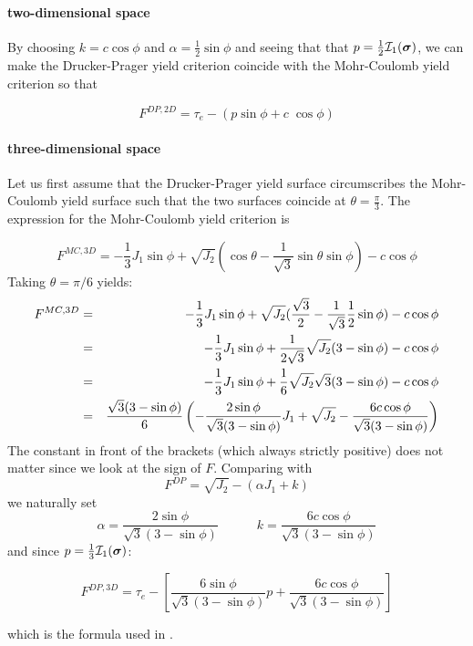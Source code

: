 \paragraph{two-dimensional space}

By choosing $k=c \cos \phi $ and $\alpha=\frac{1}{2}\sin \phi$ and seeing that that $p=\frac{1}{2} {\cal I}_1({\bm \sigma})$, we can make the Drucker-Prager yield criterion coincide with the Mohr-Coulomb yield criterion
so that 
\begin{mdframed}[backgroundcolor=blue!5]
\begin{equation}
F^{DP,2D} = \tau_e - (p \sin \phi + c \; \cos \phi) 
\end{equation}
\end{mdframed}


\paragraph{three-dimensional space}

Let us first assume that the Drucker-Prager yield surface circumscribes the Mohr-Coulomb yield surface such that the two surfaces coincide at $\theta=\tfrac{\pi}{3}$. 
The expression for the Mohr-Coulomb yield criterion is

\[
F^{MC,3D} = -\frac{1}{3}J_1 \sin \phi  + \sqrt{J_2} ( \cos \theta - \frac{1}{\sqrt{3}} \sin \theta  \sin \phi ) - c \cos \phi 
\]
Taking $\theta=\pi/6$ yields:
\begin{eqnarray}
F^{MC,3D} 
&=& -\frac{1}{3}J_1 \sin \phi  + \sqrt{J_2} ( \frac{\sqrt{3}}{2} - \frac{1}{\sqrt{3}} \frac{1}{2}  \sin \phi ) - c \cos \phi  \nonumber\\
&=& -\frac{1}{3}J_1 \sin \phi  + \frac{1}{2\sqrt{3}}\sqrt{J_2} ( 3 -  \sin \phi ) - c \cos \phi  \nonumber\\
&=& -\frac{1}{3}J_1 \sin \phi  + \frac{1}{6}\sqrt{J_2} \sqrt{3}( 3 -  \sin \phi ) - c \cos \phi  \nonumber\\
&=& \frac{\sqrt{3}(3-\sin\phi)}{6} \left( -  \frac{2 \sin \phi}{\sqrt{3}(3-\sin\phi)}   J_1  + \sqrt{J_2}  - \frac{6c \cos \phi}{\sqrt{3}(3-\sin\phi)} \right) \nonumber
\end{eqnarray}
The constant in front of the brackets (which always strictly positive) does not matter since we look at the sign of $F$.
Comparing with 
\[
F^{DP}=\sqrt{J_2} - (\alpha J_1 + k) \label{dpcriterion} 
\]
we naturally set 
\[
\alpha =\frac{2 \sin \phi}{\sqrt{3}(3-\sin\phi)}
\quad\quad\quad  
k =  \frac{6c \cos \phi}{\sqrt{3}(3-\sin\phi)} 
\]
and since $p=\frac{1}{3}{\cal I}_1({\bm \sigma})$:
\begin{mdframed}[backgroundcolor=blue!5]
\begin{equation}
F^{DP,3D} = \tau_e  - \left[ \frac{6 \sin \phi}{\sqrt{3}(3-\sin\phi)}   p  + 
\frac{6c \cos \phi}{\sqrt{3}(3-\sin\phi)}  \right]
\label{eqdp3D}
\end{equation}
\end{mdframed}
which is the formula used in \cite{gltf18}.





